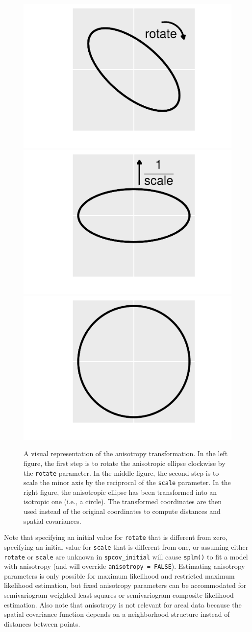 \documentclass{article}
\begin{document}
\begin{figure}
\includegraphics[width=0.33\linewidth]{preprint_files/figure-latex/anisotropy_fit-1} \includegraphics[width=0.33\linewidth]{preprint_files/figure-latex/anisotropy_fit-2} \includegraphics[width=0.33\linewidth]{preprint_files/figure-latex/anisotropy_fit-3} \caption{A visual representation of the anisotropy transformation. In the left figure, the first step is to rotate the anisotropic ellipse clockwise by the \texttt{rotate} parameter. In the middle figure, the second step is to scale the minor axis by the reciprocal of the \texttt{scale} parameter. In the right figure, the anisotropic ellipse has been transformed into an isotropic one (i.e., a circle). The transformed coordinates are then used instead of the original coordinates to compute distances and spatial covariances.}\label{fig:anisotropy_fit}
\end{figure}

Note that specifying an initial value for \texttt{rotate} that is
different from zero, specifying an initial value for \texttt{scale} that
is different from one, or assuming either \texttt{rotate} or
\texttt{scale} are unknown in \texttt{spcov\_initial} will cause
\texttt{splm()} to fit a model with anisotropy (and will override
\texttt{anisotropy\ =\ FALSE}). Estimating anisotropy parameters is only
possible for maximum likelihood and restricted maximum likelihood
estimation, but fixed anisotropy parameters can be accommodated for
semivariogram weighted least squares or semivariogram composite
likelihood estimation. Also note that anisotropy is not relevant for
areal data because the spatial covariance function depends on a
neighborhood structure instead of distances between points.
\end{document}
